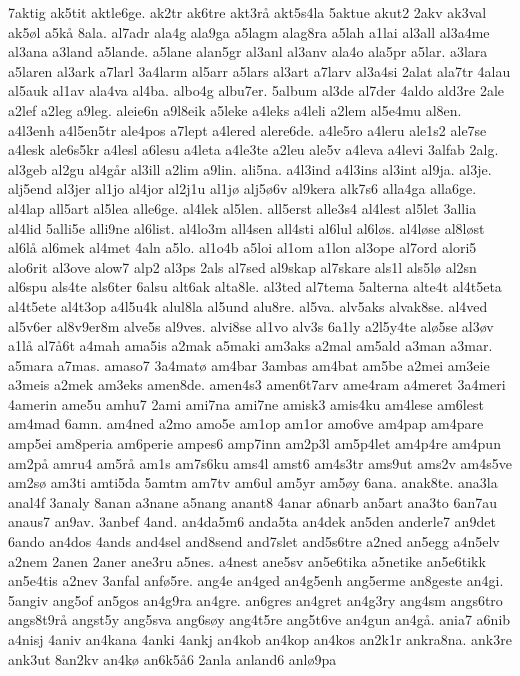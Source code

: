 {7aktig
ak5tit
aktle6ge.
ak2tr
ak6tre
akt3rå
akt5s4la
5aktue
akut2
2akv
ak3val
ak5øl
a5kå
8ala.
al7adr
ala4g
ala9ga
a5lagm
alag8ra
a5lah
a1lai
al3all
al3a4me
al3ana
a3land
a5lande.
a5lane
alan5gr
al3anl
al3anv
ala4o
ala5pr
a5lar.
a3lara
a5laren
al3ark
a7larl
3a4larm
al5arr
a5lars
al3art
a7larv
al3a4si
2alat
ala7tr
4alau
al5auk
al1av
ala4va
al4ba.
albo4g
albu7er.
5album
al3de
al7der
4aldo
ald3re
2ale
a2lef
a2leg
a9leg.
aleie6n
a9l8eik
a5leke
a4leks
a4leli
a2lem
al5e4mu
al8en.
a4l3enh
a4l5en5tr
ale4pos
a7lept
a4lered
alere6de.
a4le5ro
a4leru
ale1s2
ale7se
a4lesk
ale6s5kr
a4lesl
a6lesu
a4leta
a4le3te
a2leu
ale5v
a4leva
a4levi
3alfab
2alg.
al3geb
al2gu
al4går
al3ill
a2lim
a9lin.
ali5na.
a4l3ind
a4l3ins
al3int
al9ja.
al3je.
alj5end
al3jer
al1jo
al4jor
al2j1u
al1jø
alj5ø6v
al9kera
alk7s6
alla4ga
alla6ge.
al4lap
all5art
al5lea
alle6ge.
al4lek
al5len.
all5erst
alle3s4
al4lest
al5let
3allia
al4lid
5alli5e
alli9ne
al6list.
al4lo3m
all4sen
all4sti
al6lul
al6løs.
al4løse
al8løst
al6lå
al6mek
al4met
4aln
a5lo.
al1o4b
a5loi
al1om
a1lon
al3ope
al7ord
alori5
alo6rit
al3ove
alow7
alp2
al3ps
2als
al7sed
al9skap
al7skare
als1l
als5lø
al2sn
al6spu
als4te
als6ter
6alsu
alt6ak
alta8le.
al3ted
al7tema
5alterna
alte4t
al4t5eta
al4t5ete
al4t3op
a4l5u4k
alul8la
al5und
alu8re.
al5va.
alv5aks
alvak8se.
al4ved
al5v6er
al8v9er8m
alve5s
al9ves.
alvi8se
al1vo
alv3s
6a1ly
a2l5y4te
alø5se
al3øv
a1lå
al7å6t
a4mah
ama5is
a2mak
a5maki
am3aks
a2mal
am5ald
a3man
a3mar.
a5mara
a7mas.
amaso7
3a4matø
am4bar
3ambas
am4bat
am5be
a2mei
am3eie
a3meis
a2mek
am3eks
amen8de.
amen4s3
amen6t7arv
ame4ram
a4meret
3a4meri
4amerin
ame5u
amhu7
2ami
ami7na
ami7ne
amisk3
amis4ku
am4lese
am6lest
am4mad
6amn.
am4ned
a2mo
amo5e
am1op
am1or
amo6ve
am4pap
am4pare
amp5ei
am8peria
am6perie
ampes6
amp7inn
am2p3l
am5p4let
am4p4re
am4pun
am2på
amru4
am5rå
am1s
am7s6ku
ams4l
amst6
am4s3tr
ams9ut
ams2v
am4s5ve
am2sø
am3ti
amti5da
5amtm
am7tv
am6ul
am5yr
am5øy
6ana.
anak8te.
ana3la
anal4f
3analy
8anan
a3nane
a5nang
anant8
4anar
a6narb
an5art
ana3to
6an7au
anaus7
an9av.
3anbef
4and.
an4da5m6
anda5ta
an4dek
an5den
anderle7
an9det
6ando
an4dos
4ands
and4sel
and8send
and7slet
and5s6tre
a2ned
an5egg
a4n5elv
a2nem
2anen
2aner
ane3ru
a5nes.
a4nest
ane5sv
an5e6tika
a5netike
an5e6tikk
an5e4tis
a2nev
3anfal
anfø5re.
ang4e
an4ged
an4g5enh
ang5erme
an8geste
an4gi.
5angiv
ang5of
an5gos
an4g9ra
an4gre.
an6gres
an4gret
an4g3ry
ang4sm
angs6tro
angs8t9rå
angst5y
ang5sva
ang6søy
ang4t5re
ang5t6ve
an4gun
an4gå.
ania7
a6nib
a4nisj
4aniv
an4kana
4anki
4ankj
an4kob
an4kop
an4kos
an2k1r
ankra8na.
ank3re
ank3ut
8an2kv
an4kø
an6k5å6
2anla
anland6
anlø9pa
}
